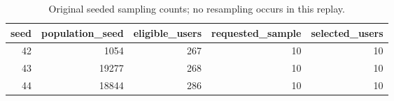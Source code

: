 \begin{table}[htbp!]
\centering
\small
\setlength{\tabcolsep}{3pt}
\renewcommand{\arraystretch}{1.1}
\begin{tabular}{rrrrr}
\hline
seed & population\_seed & eligible\_users & requested\_sample & selected\_users \\
\hline
42 & 1054 & 267 & 10 & 10 \\
43 & 19277 & 268 & 10 & 10 \\
44 & 18844 & 286 & 10 & 10 \\
\hline
\end{tabular}
\caption{Original seeded sampling counts; no resampling occurs in this replay.}
\label{chap:results:tab:rq3_profile_review_sampling}
\end{table}
